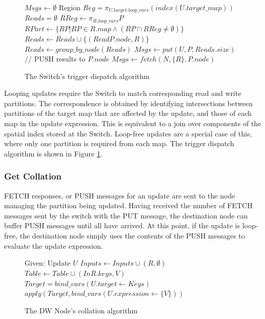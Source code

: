 \documentclass{sig-alternate}
\begin{document}
\begin{figure}
\begin{algorithmic}[1]
\STATE $Msgs \leftarrow \emptyset$
	\STATE Region $Reg = \pi_{U.target.loop\_vars} \left(index(U.target\_map)\right)$
		\STATE $Reads = \emptyset$
			\STATE $RReg \leftarrow \pi_{R.loop\_vars} P$
			\STATE $RPart \leftarrow \{RP | RP\in R.map \wedge (RP \cap RReg \neq \emptyset)\}$
			\STATE $Reads \leftarrow Reads \cup \{(ReadP.node, R)\}$
		\ENDFOR
		\STATE $Reads \leftarrow group\_by\_node(Reads)$
		\STATE $Msgs \leftarrow put(U, P, Reads.size)$
		  \STATE // PUSH results to $P.node$
			\STATE $Msgs \leftarrow fetch(N, \{R\}, P.node)$
		\ENDFOR
	\ENDFOR
\ENDFOR
\end{algorithmic}
\caption{The Switch's trigger dispatch algorithm}
\label{alg:dispatch}
\end{figure}

Looping updates require the Switch to match corresponding read and write partitions.  The correspondence is obtained by identifying intersections between partitions of the target map that are affected by the update, and those of each map in the update expression.  This is equivalent to a join over components of the spatial index stored at the Switch.  Loop-free updates are a special case of this, where only one partition is required from each map.  The trigger dispatch algorithm is shown in Figure \ref{alg:dispatch}.

\subsubsection{Get Collation}

FETCH responses, or PUSH messages for an update are sent to the node managing the partition being updated.  Having received the number of FETCH messages sent by the switch with the PUT message, the destination node can buffer PUSH messages until all have arrived.  At this point, if the update is loop-free, the destination node simply uses the contents of the PUSH messages to evaluate the update expression.

\begin{figure}
\begin{algorithmic}[1]
\STATE Given: Update $U$
	\STATE $Inputs \leftarrow Inputs \cup (R, \emptyset)$
\ENDFOR
{}
			\STATE $Table \leftarrow Table \cup (InR.keys, V)$
		\ENDIF
	\ENDFOR
\ENDFOR
{}
	\STATE $Target = bind\_vars(U.target \leftarrow Keys)$
	\STATE $apply(Target, bind\_vars(U.expression \leftarrow \{V\}))$
\ENDFOR
\end{algorithmic}
\caption{The DW Node's collation algorithm}
\label{alg:collation}
\end{figure}
\end{document}
